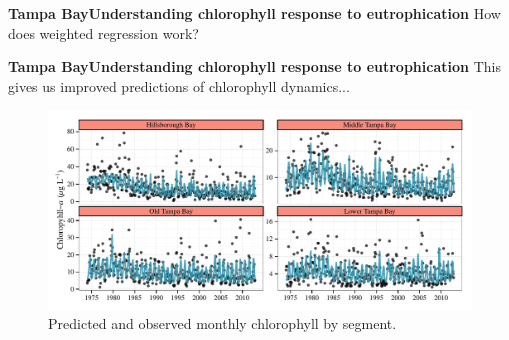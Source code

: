 \documentclass[serif]{beamer}\usepackage[]{graphicx}\usepackage[]{color}
\begin{document}
\begin{frame}{\textbf{Tampa Bay}}{\textbf{Understanding chlorophyll response to eutrophication}}
How does weighted regression work?
\begin{center}
\end{center}
\end{frame}

\begin{frame}{\textbf{Tampa Bay}}{\textbf{Understanding chlorophyll response to eutrophication}}
This gives us improved predictions of chlorophyll dynamics...
\begin{figure}[!ht]


{\centering \includegraphics[width=\linewidth]{fig//predvals} 

}

\caption[Predicted and observed monthly chlorophyll by segment]{Predicted and observed monthly chlorophyll by segment.\label{fig:/predvals}}
\end{figure}


\end{frame}
\end{document}
